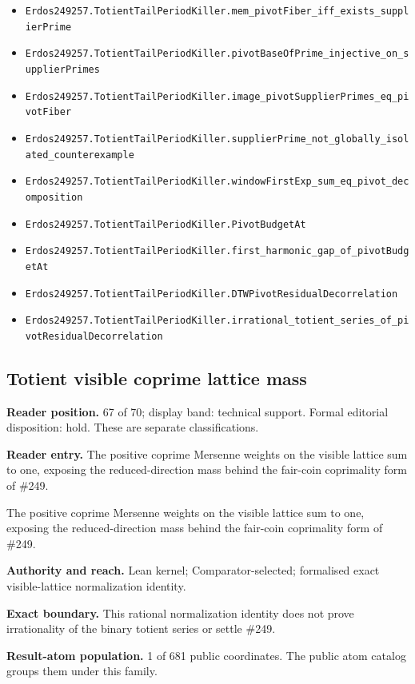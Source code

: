 \begin{itemize}
  \item \nolinkurl{Erdos249257.TotientTailPeriodKiller.mem_pivotFiber_iff_exists_supplierPrime}
  \item \nolinkurl{Erdos249257.TotientTailPeriodKiller.pivotBaseOfPrime_injective_on_supplierPrimes}
  \item \nolinkurl{Erdos249257.TotientTailPeriodKiller.image_pivotSupplierPrimes_eq_pivotFiber}
  \item \nolinkurl{Erdos249257.TotientTailPeriodKiller.supplierPrime_not_globally_isolated_counterexample}
  \item \nolinkurl{Erdos249257.TotientTailPeriodKiller.windowFirstExp_sum_eq_pivot_decomposition}
  \item \nolinkurl{Erdos249257.TotientTailPeriodKiller.PivotBudgetAt}
  \item \nolinkurl{Erdos249257.TotientTailPeriodKiller.first_harmonic_gap_of_pivotBudgetAt}
  \item \nolinkurl{Erdos249257.TotientTailPeriodKiller.DTWPivotResidualDecorrelation}
  \item \nolinkurl{Erdos249257.TotientTailPeriodKiller.irrational_totient_series_of_pivotResidualDecorrelation}
\end{itemize}

\subsection{Totient visible coprime lattice mass}
\textbf{Reader position.} 67 of 70; display band: technical support.  Formal editorial disposition: hold.  These are separate classifications.

\textbf{Reader entry.} The positive coprime Mersenne weights on the visible lattice sum to one, exposing the reduced-direction mass behind the fair-coin coprimality form of \#249.

The positive coprime Mersenne weights on the visible lattice sum to one, exposing the reduced-direction mass behind the fair-coin coprimality form of \#249.

\textbf{Authority and reach.} Lean kernel; Comparator-selected; formalised exact visible-lattice normalization identity.

\textbf{Exact boundary.} This rational normalization identity does not prove irrationality of the binary totient series or settle \#249.

\textbf{Result-atom population.} 1 of 681 public coordinates. The public atom catalog groups them under this family.


